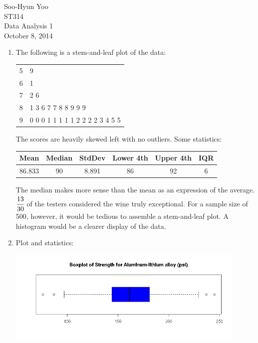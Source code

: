 \documentclass[12pt,letterpaper]{article}
\begin{document}
Soo-Hyun Yoo \\
ST314 \\
Data Analysis 1\\
October 8, 2014

\begin{enumerate}
	\item The following is a stem-and-leaf plot of the data:

		\begin{table}[!h]
			\centering
			\begin{tabular}{r|l}
				5 & 9 \\
				6 & 1 \\
				7 & 2 6 \\
				8 & 1 3 6 7 7 8 8 9 9 9 \\
				9 & 0 0 0 1 1 1 1 1 2 2 2 2 3 4 5 5 \\
			\end{tabular}
		\end{table}

		The scores are heavily skewed left with no outliers. Some statistics:

		\begin{table}[!h]
			\centering
			\begin{tabular}{|c|c|c|c|c|c|} \hline
				Mean & Median & StdDev & Lower 4th & Upper 4th & IQR \\ \hline
				86.833 & 90 & 8.891 & 86 & 92 & 6 \\ \hline
			\end{tabular}
		\end{table}

		The median makes more sense than the mean as an expression of
		the average. $\cfrac{13}{30}$ of the testers considered the
		wine truly exceptional. For a sample size of 500, however, it
		would be tedious to assemble a stem-and-leaf plot. A histogram
		would be a clearer display of the data.

	\item Plot and statistics:

		\includegraphics[width=0.9\textwidth]{p2.png}


\end{enumerate}
\end{document}
